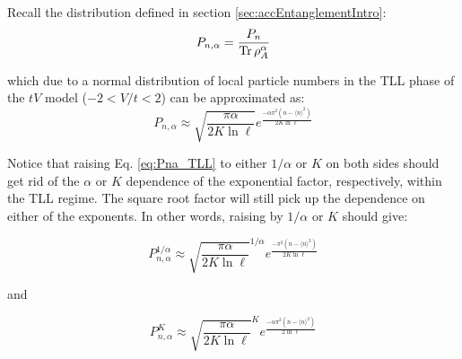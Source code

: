 Recall the distribution defined in section \ref{sec:accEntanglementIntro}:
%
\begin{equation}
P_{n,\alpha} = \frac{P_{n}}{\operatorname{Tr}\rho_{A}^{\alpha}}
\label{eq:Pna}
\end{equation}
 
which due to a normal distribution of local particle numbers  in the TLL phase of the $tV$ model ($-2 < V/t < 2$) can be approximated as:
%
\begin{equation}
P_{n,\alpha} \approx \sqrt{\frac{\pi\alpha}{2K\ln{\ell}}} e^{\frac{-\alpha \pi^2 (n - \langle n \rangle^2 )}{2K\ln{\ell}}} 
\label{eq:Pna_TLL}
\end{equation}
 
Notice that raising Eq. \ref{eq:Pna_TLL} to either $1/\alpha$ or $K$ on both sides should get rid of the $\alpha$ or $K$ dependence of the exponential factor, respectively, within the TLL regime. The square root factor will still pick up the dependence on either of the exponents. In other words, raising by $1/\alpha$ or $K$ should give:
 
 \begin{equation}
 P_{n,\alpha}^{1/\alpha} \approx \sqrt{\frac{\pi\alpha}{2K\ln{\ell}}}^{1/\alpha} e^{\frac{- \pi^2 (n - \langle n \rangle^2 )}{2K\ln{\ell}}} 
 \label{eq:Pna_to_alphaInv}
 \end{equation}
 
 and
 
 \begin{equation}
 P_{n,\alpha}^{K} \approx \sqrt{\frac{\pi\alpha}{2K\ln{\ell}}}^K e^{\frac{- \alpha \pi^2 (n - \langle n \rangle^2 )}{2\ln{\ell}}} 
 \label{eq:Pna_to_K}
 \end{equation}
 
